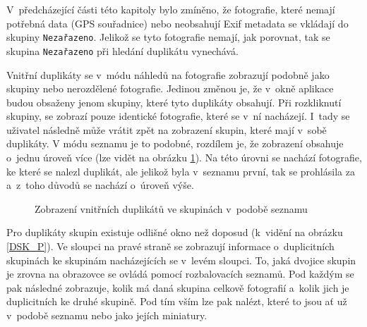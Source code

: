 V~předcházející části této kapitoly bylo zmíněno, že fotografie, které nemají potřebná data (GPS souřadnice) nebo neobsahují Exif metadata se vkládají do skupiny \texttt{Nezařazeno}. Jelikož se tyto fotografie nemají, jak porovnat, tak se skupina \texttt{Nezařazeno} při hledání duplikátu vynechává.

Vnitřní duplikáty se v~módu náhledů na fotografie zobrazují podobně jako skupiny nebo nerozdělené fotografie. Jedinou změnou je, že v~okně aplikace budou obsaženy jenom skupiny, které tyto duplikáty obsahují. Při rozkliknutí skupiny, se zobrazí pouze identické fotografie, které se v~ní nacházejí. I~tady se uživatel následně může vrátit zpět na zobrazení skupin, které mají v~sobě duplikáty. V módu seznamu je to podobné, rozdílem je, že zobrazení obsahuje o~jednu úroveň více (lze vidět na obrázku \ref{DIN_S}). Na této úrovni se nachází fotografie, ke které se nalezl duplikát, ale jelikož byla v~seznamu první, tak se prohlásila za  a~z~toho důvodů se nachází o~úroveň výše.

\begin{figure}[h]
\begin{center}
\caption{Zobrazení vnitřních duplikátů ve skupinách v~podobě seznamu}
\label{DIN_S}
\end{center}
\end{figure}

Pro duplikáty skupin existuje odlišné okno než doposud (k~vidění na obrázku \ref{DSK_P}). Ve sloupci na pravé straně se zobrazují informace o~duplicitních skupinách ke skupinám nacházejících se v~levém sloupci. To, jaká dvojice skupin je zrovna na obrazovce se ovládá pomocí rozbalovacích seznamů. Pod každým se pak následné zobrazuje, kolik má daná skupina celkově fotografií a~kolik jich je duplicitních ke druhé skupině. Pod tím vším lze pak nalézt, které to jsou ať už v~podobě seznamu nebo jako jejích miniatury.

